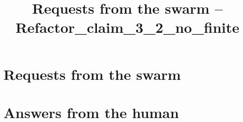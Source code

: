 \documentclass[12pt, a4paper]{scrartcl}
\title{Requests from the swarm -- Refactor_claim_3_2_no_finite}
\begin{document}
\maketitle

\section*{Requests from the swarm}

\section*{Answers from the human}
\end{document}
